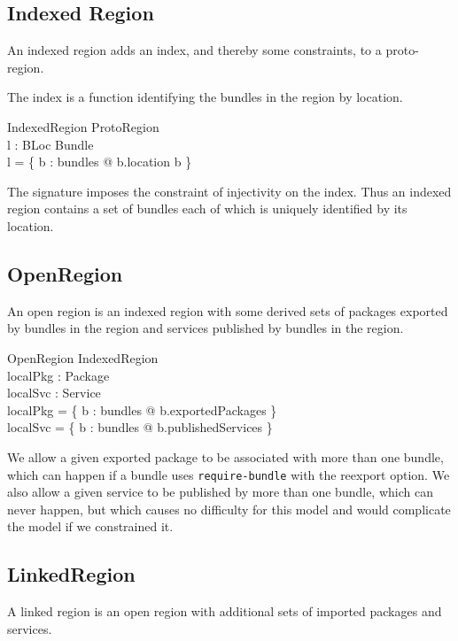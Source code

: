 \documentclass[a4paper,9pt]{article}
\begin{document}
\subsection{Indexed Region}

An indexed region adds an index, and thereby some constraints, to a proto-region.

The index is a function identifying the bundles in the region by location.
\begin{schema}{IndexedRegion}
  ProtoRegion \\
  l : BLoc \pinj Bundle \\
\where
  l = \{ b : bundles @ b.location \mapsto b \} \\
\end{schema}
The signature imposes the constraint of injectivity on the index.
Thus an indexed region contains a set of bundles each of which is uniquely identified
by its location.

\subsection{OpenRegion}

An open region is an indexed region with some derived sets of packages exported by bundles in the region
and services published by bundles in the region.

\begin{schema}{OpenRegion}
  IndexedRegion \\
  localPkg : \power Package \\
  localSvc : \power Service \\
\where
  localPkg = \bigcup \{ b : bundles @ b.exportedPackages \} \\
  localSvc = \bigcup \{ b : bundles @ b.publishedServices \} \\
\end{schema}
We allow a given exported package to be associated with more than one bundle, which can happen if a bundle uses
\texttt{require-bundle} with the reexport option.
We also allow a given service to be published by more than one bundle, which can never happen, but which causes
no difficulty for this model and would complicate the model if we constrained it.

\subsection{LinkedRegion}

A linked region is an open region with additional sets of imported packages and services.
\end{document}
